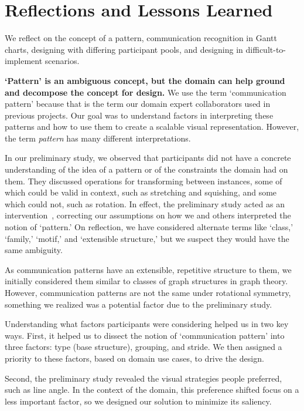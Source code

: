 \section{Reflections and Lessons Learned}
\label{sec:reflections}

We reflect on the concept of a pattern, communication recognition in Gantt charts, designing with differing participant pools, and designing in difficult-to-implement scenarios.

\vspace{1ex}

\textbf{`Pattern' is an ambiguous concept, but the domain can help ground and decompose the concept for design.} We use the term `communication pattern' because that is the term our domain expert collaborators used in previous projects. Our goal was to understand factors in interpreting these patterns and how to use them to create a scalable visual representation. However, the term {\em pattern} has many different interpretations. 

In our preliminary study, we observed that participants did not have a concrete understanding of the idea of a pattern or of the constraints the domain had on them. They discussed operations for transforming between instances, some of which could be valid in context, such as stretching and squishing, and some which could not, such as rotation. In effect, the preliminary study acted as an intervention~\cite{Bigelow2021}, correcting our assumptions on how we and others interpreted the notion of `pattern.' On reflection, we have considered alternate terms like `class,' `family,' `motif,' and `extensible structure,' but we suspect they would have the same ambiguity.

As communication patterns have an extensible, repetitive structure to them, we initially considered them similar to classes of graph structures in graph theory. However, communication patterns are not the same under rotational symmetry, something we realized was a potential factor due to the preliminary study. 

Understanding what factors participants were considering helped us in two key ways. First, it helped us to dissect the notion of `communication pattern' into three factors: type (base structure), grouping, and stride. We then assigned a priority to these factors, based on domain use cases, to drive the design. 

Second, the preliminary study revealed the visual strategies people preferred, such as line angle. In the context of the domain, this preference shifted focus on a less important factor, so we designed our solution to minimize its saliency.

